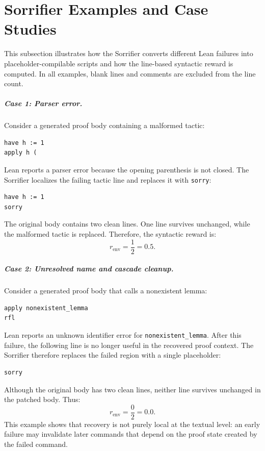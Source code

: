 \chapter{Sorrifier Examples and Case Studies}
\label{app:sorrifier-examples}

This subsection illustrates how the Sorrifier converts different Lean failures into
placeholder-compilable scripts and how the line-based syntactic reward is computed. In all examples,
blank lines and comments are excluded from the line count.

\paragraph{Case 1: Parser error.}
Consider a generated proof body containing a malformed tactic:
\begin{verbatim}
have h := 1
apply h (
\end{verbatim}
Lean reports a parser error because the opening parenthesis is not closed. The Sorrifier localizes
the failing tactic line and replaces it with \texttt{sorry}:
\begin{verbatim}
have h := 1
sorry
\end{verbatim}
The original body contains two clean lines. One line survives unchanged, while the malformed tactic is
replaced. Therefore, the syntactic reward is:
\[
r_{\text{env}} = \frac{1}{2} = 0.5.
\]

\paragraph{Case 2: Unresolved name and cascade cleanup.}
Consider a generated proof body that calls a nonexistent lemma:
\begin{verbatim}
apply nonexistent_lemma
rfl
\end{verbatim}
Lean reports an unknown identifier error for \texttt{nonexistent\_lemma}. After this failure, the following
line is no longer useful in the recovered proof context. The Sorrifier therefore replaces the failed
region with a single placeholder:
\begin{verbatim}
sorry
\end{verbatim}
Although the original body has two clean lines, neither line survives unchanged in the patched body.
Thus:
\[
r_{\text{env}} = \frac{0}{2} = 0.0.
\]
This example shows that recovery is not purely local at the textual level: an early failure may invalidate
later commands that depend on the proof state created by the failed command.

